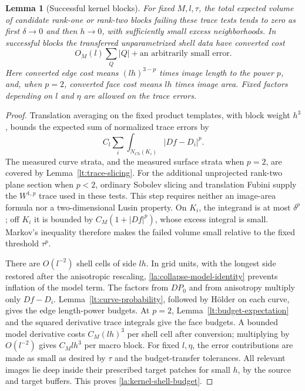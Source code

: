 \documentclass[11pt]{article}
\numberwithin{equation}{section}
\newtheorem{lemma}[theorem]{Lemma}
\theoremstyle{definition}
\theoremstyle{remark}
\begin{document}
\begin{lemma}[Successful kernel blocks]\label{la:kernel-selection}
For fixed $M,l,\tau$, the total expected volume of candidate
rank-one or rank-two blocks failing these trace tests tends to zero
as first $\delta\to0$ and then $h\to0$, with sufficiently small
excess neighborhoods.  In successful blocks the transferred
unparametrized shell data have converted cost
\begin{equation}\label{la:kernel-shell-budget}
 O_M(l)\sum_Q|Q|+\text{an arbitrarily small error}.
\end{equation}
Here converted edge cost means $(lh)^{3-p}$ times image length to the
power $p$, and, when $p=2$, converted face cost means $lh$ times
image area.  Fixed factors depending on $l$ and $\eta$ are allowed
on the trace errors.
\end{lemma}

\begin{proof}
Translation averaging on the fixed product templates, with block
weight $h^3$, bounds the expected sum of normalized trace errors by
\begin{equation}\label{la:trace-test-expectation}
 C_l\sum_i\int_{N_{Ch}(K_i)}|Df-D_i|^p.
\end{equation}
The measured curve strata, and the measured surface strata when $p=2$,
are covered by Lemma~\ref{lt:trace-slicing}. For the additional
unprojected rank-two plane section when $p<2$, ordinary Sobolev slicing
and translation Fubini supply the $W^{1,p}$ trace used in these tests.
This step requires neither an image-area formula nor a two-dimensional
Lusin property. On $K_i$, the integrand is at most
$\delta^p$; off $K_i$ it is bounded by
$C_M(1+|Df|^p)$, whose excess integral is small.  Markov's inequality
therefore makes the failed volume small relative to the fixed
threshold $\tau^p$.

There are $O(l^{-2})$ shell cells of side $lh$.  In grid units, with
the longest side restored after the anisotropic rescaling,
\eqref{la:collapse-model-identity} prevents inflation of the model
term.  The factors from $DP_0$ and from anisotropy multiply only
$Df-D_i$.  Lemma~\ref{lt:curve-probability}, followed by H\"older
on each curve, gives the edge length-power budgets.  At $p=2$,
Lemma~\ref{lt:budget-expectation} and the squared derivative trace
integrals give the face budgets.  A bounded model derivative costs
$C_M(lh)^3$ per shell cell after conversion; multiplying by
$O(l^{-2})$ gives $C_Mlh^3$ per macro block.  For fixed $l,\eta$, the
error contributions are made as small as desired by $\tau$ and the
budget-transfer tolerances.  All relevant images lie deep inside
their prescribed target patches for small $h$, by the source and
target buffers.  This proves \eqref{la:kernel-shell-budget}.
\end{proof}
\end{document}
